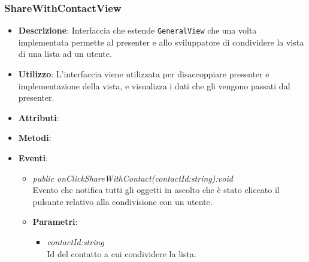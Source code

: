 \subsubsection{ShareWithContactView}
\begin{itemize}
\item \textbf{Descrizione}: Interfaccia che estende \texttt{GeneralView} che una volta implementata permette al presenter e allo sviluppatore di condividere la vista di una lista ad un utente.
\item \textbf{Utilizzo}: L'interfaccia viene utilizzata per disaccoppiare presenter e implementazione della vista, e visualizza i dati che gli vengono passati dal presenter.
\item \textbf{Attributi}: 
\item \textbf{Metodi}:
\item \textbf{Eventi}:
\begin{itemize}
\item \textit{public onClickShareWithContact(contactId:string):void}\\
	Evento che notifica tutti gli oggetti in ascolto che è stato cliccato il pulsante relativo alla condivisione con un utente.
	\item{\textbf{Parametri}: \begin{itemize}
	\item \textit{contactId:string}\\
	Id del contatto a cui condividere la lista.
	\end{itemize}}
\end{itemize}
\end{itemize}

